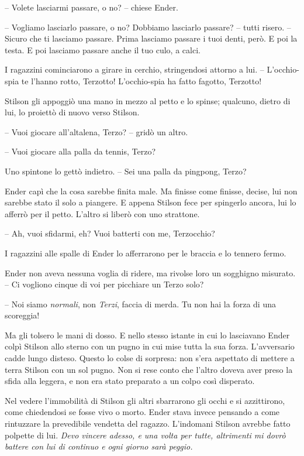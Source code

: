 {-- Volete lasciarmi passare, o no? -- chiese Ender.}

{-- Vogliamo lasciarlo passare, o no? Dobbiamo lasciarlo passare? --
	tutti risero. -- Sicuro che ti lasciamo passare. Prima lasciamo passare
	i tuoi denti, però. E poi la testa. E poi lasciamo passare anche il tuo
	culo, a calci.}

{I ragazzini cominciarono a girare in cerchio, stringendosi attorno a
	lui. -- L'occhio-spia te l'hanno rotto, Terzotto! L'occhio-spia ha fatto
	fagotto, Terzotto!}

{Stilson gli appoggiò una mano in mezzo al petto e lo spinse; qualcuno,
	dietro di lui, lo proiettò di nuovo verso Stilson.}

{-- Vuoi giocare all'altalena, Terzo? -- gridò un altro.}

{-- Vuoi giocare alla palla da tennis, Terzo?}

{Uno spintone lo gettò indietro. -- Sei una palla da pingpong, Terzo?}

{Ender capì che la cosa sarebbe finita male. Ma finisse come finisse,
	decise, lui non sarebbe stato il solo a piangere. E appena Stilson fece
	per spingerlo ancora, lui lo afferrò per il petto. L'altro si liberò con
	uno strattone.}

{-- Ah, vuoi sfidarmi, eh? Vuoi batterti con me, Terzocchio?}

{I ragazzini alle spalle di Ender lo afferrarono per le braccia e lo
	tennero fermo.}

{Ender non aveva nessuna voglia di ridere, ma rivolse loro un sogghigno
	misurato. -- Ci vogliono cinque di voi per picchiare un Terzo solo?}

{-- Noi siamo \emph{normali}, \emph{} non \emph{Terzi}, \emph{} faccia
	di merda. Tu non hai la forza di una scoreggia!}

{Ma gli tolsero le mani di dosso. E nello stesso istante in cui lo
	lasciavano Ender colpì Stilson allo sterno con un pugno in cui mise
	tutta la sua forza. L'avversario cadde lungo disteso. Questo lo colse di
	sorpresa: non s'era aspettato di mettere a terra Stilson con un sol
	pugno. Non si rese conto che l'altro doveva aver preso la sfida alla
	leggera, e non era stato preparato a un colpo così disperato.}

{Nel vedere l'immobilità di Stilson gli altri sbarrarono gli occhi e si
	azzittirono, come chiedendosi se fosse vivo o morto. Ender stava invece
	pensando a come rintuzzare la prevedibile vendetta del ragazzo.
	L'indomani Stilson avrebbe fatto polpette di lui. \emph{Devo vincere
		adesso, e una volta per tutte, altrimenti mi dovrò battere con lui di
		continuo e ogni giorno sarà peggio.}}

